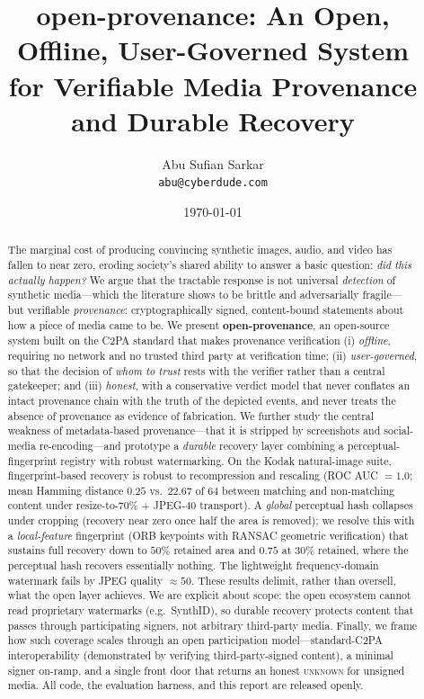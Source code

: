 \documentclass[11pt]{article}
\title{\textbf{open-provenance}: An Open, Offline, User-Governed System\\
for Verifiable Media Provenance and Durable Recovery}
\author{Abu Sufian Sarkar\\\texttt{abu@cyberdude.com}}
\date{\today}
\newcommand{\state}[1]{\textsc{#1}}
\begin{document}
\maketitle

\begin{abstract}
The marginal cost of producing convincing synthetic images, audio, and video has fallen to
near zero, eroding society's shared ability to answer a basic question: \emph{did this
actually happen?} We argue that the tractable response is not universal \emph{detection} of
synthetic media---which the literature shows to be brittle and adversarially
fragile---but verifiable \emph{provenance}: cryptographically signed, content-bound
statements about how a piece of media came to be. We present \textbf{open-provenance}, an
open-source system built on the C2PA standard that makes provenance verification (i)
\emph{offline}, requiring no network and no trusted third party at verification time; (ii)
\emph{user-governed}, so that the decision of \emph{whom to trust} rests with the verifier
rather than a central gatekeeper; and (iii) \emph{honest}, with a conservative verdict
model that never conflates an intact provenance chain with the truth of the depicted
events, and never treats the absence of provenance as evidence of fabrication. We further
study the central weakness of metadata-based provenance---that it is stripped by
screenshots and social-media re-encoding---and prototype a \emph{durable} recovery layer
combining a perceptual-fingerprint registry with robust watermarking. On the Kodak
natural-image suite, fingerprint-based recovery is robust to recompression and rescaling
(ROC AUC $=1.0$; mean Hamming distance $0.25$ vs.\ $22.67$ of $64$ between matching and
non-matching content under resize-to-$70\%$ + JPEG-$40$ transport). A \emph{global}
perceptual hash collapses under cropping (recovery near zero once half the area is removed);
we resolve this with a \emph{local-feature} fingerprint (ORB keypoints with RANSAC geometric
verification) that sustains full recovery down to $50\%$ retained area and $0.75$ at $30\%$
retained, where the perceptual hash recovers essentially nothing. The lightweight
frequency-domain watermark fails by JPEG quality $\approx 50$. These results delimit, rather
than oversell, what the open layer achieves. We are explicit about scope: the
open ecosystem cannot read proprietary watermarks (e.g.\ SynthID), so durable recovery
protects content that passes through participating signers, not arbitrary third-party
media. Finally, we frame how such coverage scales through an open participation
model---standard-C2PA interoperability (demonstrated by verifying third-party-signed
content), a minimal signer on-ramp, and a single front door that returns an honest
\state{unknown} for unsigned media. All code, the evaluation harness, and this report are
released openly.
\end{abstract}
\end{document}
